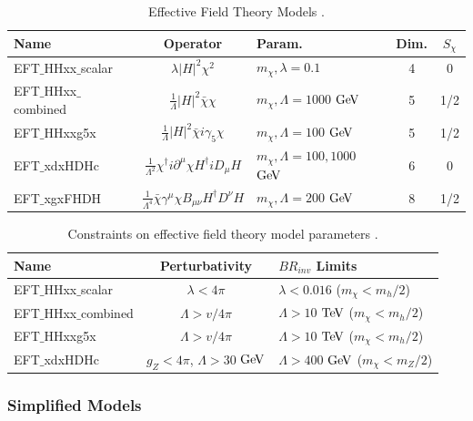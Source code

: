 \begin{table}[htbH]
\begin{center}
\begin{tabular}{ l | c | l | c | c}
\hline
Name & Operator & Param. & Dim. & $S_{\chi}$ \\
\hline
EFT$\_$HHxx$\_$scalar & $\lambda |H|^{2} \chi^{2}$ & $m_{\chi}, \lambda = 0.1$ & 4 & 0 \\
EFT$\_$HHxx$\_$combined & $\frac{1}{\Lambda} |H|^{2} \bar{\chi} \chi$ & $m_{\chi}, \Lambda = 1000$ $\mathrm{Ge\kern -0.1em V}$ & 5 & 1/2 \\
EFT$\_$HHxxg5x & $\frac{1}{\Lambda} |H|^{2} \bar{\chi} i \gamma_{5} \chi$ & $m_{\chi}, \Lambda = 100$ $\mathrm{Ge\kern -0.1em V}$ & 5 & 1/2\\
EFT$\_$xdxHDHc & $\frac{1}{\Lambda^{2}} \chi^{\dag} i \partial^{\mu} \chi H^{\dag} i D_{\mu} H $ & $m_{\chi}, \Lambda = 100,1000$ $\mathrm{Ge\kern -0.1em V}$ & 6 & 0\\
EFT$\_$xgxFHDH & $\frac{1}{\Lambda^{4}} \bar{\chi} \gamma^{\mu} \chi B_{\mu\nu} H^{\dag} D^{\nu} H$ & $m_{\chi}, \Lambda = 200$ $\mathrm{Ge\kern -0.1em V}$ & 8 & 1/2\\
\hline
\end{tabular}
\caption{Effective Field Theory Models \cite{Carpenter:2013xra}.}\label{tab:efts}
\end{center}
\end{table}

\begin{table}[htbH]
\begin{center}
\begin{tabular}{ l | c | l}
\hline
Name & Perturbativity & $BR_{inv}$ Limits \\
\hline
EFT$\_$HHxx$\_$scalar & $\lambda < 4\pi$ & $\lambda < 0.016$ ($m_\chi < m_h/2$)\\
EFT$\_$HHxx$\_$combined & $\Lambda > v/4\pi $ & $\Lambda > 10$ $\mathrm{Te\kern -0.1em V}$ ($m_\chi < m_h/2$)\\
EFT$\_$HHxxg5x & $\Lambda > v/4\pi $ & $\Lambda > 10$ $\mathrm{Te\kern -0.1em V}$ ($m_\chi < m_h/2$) \\
EFT$\_$xdxHDHc & $g_Z < 4\pi$, $\Lambda > 30$ $\mathrm{Ge\kern -0.1em V}$ & $\Lambda > 400$ $\mathrm{Ge\kern -0.1em V}$ ($m_\chi < m_Z/2$) \\
\hline
\end{tabular}
\caption{Constraints on effective field theory model parameters \cite{Carpenter:2013xra}.}\label{tab:eftlims}
\end{center}
\end{table}

\subsubsection{Simplified Models}

